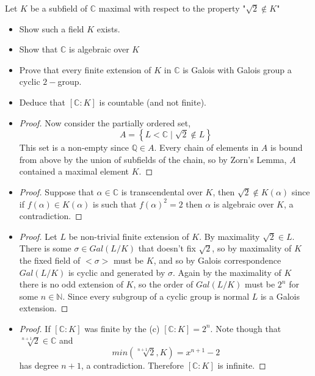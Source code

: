 \documentclass[11pt]{article}
\newenvironment{problem}[2][Problem\!]{\begin{tcolorbox}\begin{trivlist}
\item[\hskip \labelsep {\bfseries #1}\hskip \labelsep {\bfseries #2}]}{\end{trivlist}\end{tcolorbox}}
\newcommand{\qq}{\mathbb Q}   %
\newcommand{\nn}{\mathbb N}   %
\newcommand{\cc}{\mathbb C}   %
\newcommand{\set}[1]{\left\{#1\right\}} %
\begin{document}
\begin{problem} {14.9.12}
    Let $K$ be a subfield of $\cc$ maximal with respect to the property "$\sqrt{2}\notin K$"
    \begin{itemize}
        \item[(a)] Show such a field $K$ exists.
        \item[(b)]  Show that $\cc$ is algebraic over $K$
        \item[(c)] Prove that every finite extension of $K$ in $\cc$ is Galois with Galois group a cyclic $2-$group.
        \item[(d)] Deduce that $[\cc:K]$ is countable (and not finite). 
    \end{itemize}
\end{problem}
\begin{itemize}
    \item[(a)]
    \begin{proof}
        Now consider the partially ordered set,
        \[A = \set{L < \cc \mid \sqrt{2} \notin L}\]
        This set is a non-empty since $\qq \in A$. Every chain of elements in $A$ is bound from above by the union of subfields of the chain, so by Zorn's Lemma, $A$ contained a maximal element $K$.
    \end{proof} 
    \item[(b)]
    \begin{proof}
        Suppose that $\alpha \in \cc$ is transcendental over $K$, then $\sqrt{2} \notin K(\alpha)$ since if $f(\alpha) \in K(\alpha)$ is such that $f(\alpha)^{2} = 2$ then $\alpha$ is algebraic over $K$, a contradiction.
    \end{proof}
    \item[(c)]
    \begin{proof}
         Let $L$ be non-trivial finite extension of $K$. By maximality $\sqrt{2}\in L$. There is some $\sigma \in Gal(L/K)$ that doesn't fix $\sqrt{2}$, so by maximality of $K$ the fixed field of $<\sigma>$ must be $K$, and so by Galois correspondence $Gal(L/K)$ is cyclic and generated by $\sigma$. Again by the maximality of $K$ there is no odd extension of $K$, so the order of $Gal(L/K)$ must be $2^{n}$ for some $n\in\nn$. Since every subgroup of a cyclic group is normal $L$ is a Galois extension. 
    \end{proof} 
    \item[(d)]
    \begin{proof}
        If $[\cc: K]$ was finite by the (c) $[\cc:K] = 2^{n}$. Note though that $\sqrt[n+1]{2}\in \cc$ and \[min(\sqrt[n+1]{2}, K) = x^{n+1}  -2\] has degree $n+1$, a contradiction. Therefore $[\cc:K]$ is infinite. 
    \end{proof}    
\end{itemize}
\end{document}
